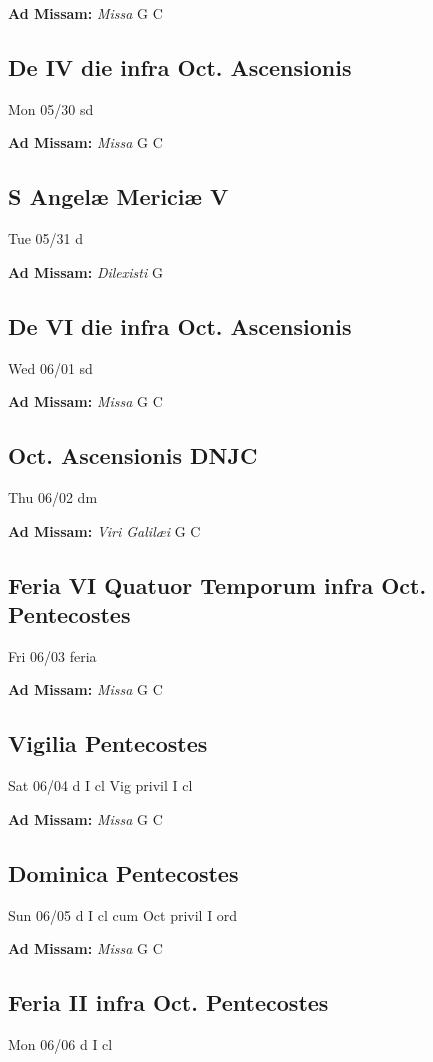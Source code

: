 \documentclass[letterpaper, 10pt, twocolumn]{article}
\begin{document}
\textbf{Ad Missam:} \textit{Missa} G C 

\subsection*{De IV die infra Oct. Ascensionis}Mon 05/30 sd

\textbf{Ad Missam:} \textit{Missa} G C 

\subsection*{S Angelæ Mericiæ V}Tue 05/31 d

\textbf{Ad Missam:} \textit{Dilexisti} G 

\subsection*{De VI die infra Oct. Ascensionis}Wed 06/01 sd

\textbf{Ad Missam:} \textit{Missa} G C 

\subsection*{Oct. Ascensionis DNJC}Thu 06/02 dm

\textbf{Ad Missam:} \textit{Viri Galilæi} G C 

\subsection*{Feria VI Quatuor Temporum infra Oct. Pentecostes}Fri 06/03 feria

\textbf{Ad Missam:} \textit{Missa} G C 

\subsection*{Vigilia Pentecostes}Sat 06/04 d I cl Vig privil I cl

\textbf{Ad Missam:} \textit{Missa} G C 

\subsection*{Dominica Pentecostes}Sun 06/05 d I cl cum Oct privil I ord

\textbf{Ad Missam:} \textit{Missa} G C 

\subsection*{Feria II infra Oct. Pentecostes}Mon 06/06 d I cl
\end{document}
